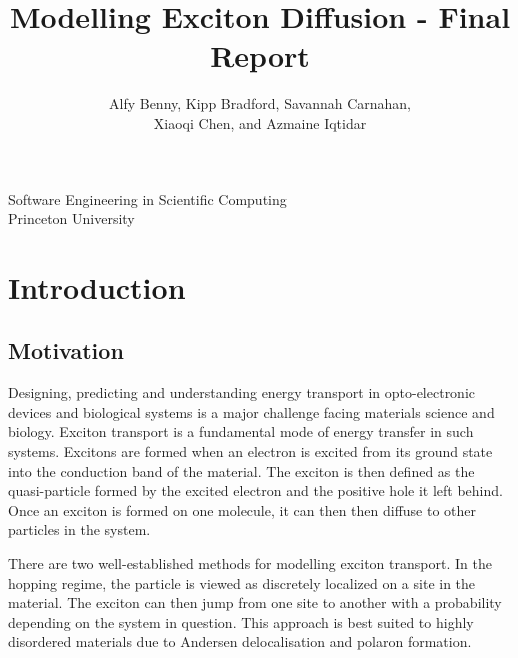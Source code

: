 \documentclass{article}
\title{Modelling Exciton Diffusion - Final Report}
\author{Alfy Benny, Kipp Bradford, Savannah Carnahan,\\ Xiaoqi Chen, and Azmaine Iqtidar}
\begin{document}
       \maketitle
      
       \vfill
            
       
            
      \vfill
     
       \begin{center}
            
       Software Engineering in Scientific Computing\\
       Princeton University\\
       
    \end{center}    
  
\newpage

\tableofcontents %


\section{Introduction}

\subsection{Motivation}

Designing, predicting and understanding energy transport in opto-electronic devices and biological systems is a major challenge facing materials science and biology. Exciton transport is a fundamental mode of energy transfer in such systems. Excitons are formed when an electron is excited from its ground state into the conduction band of the material. The exciton is then defined as the quasi-particle formed by the excited electron and the positive hole it left behind. Once an exciton is formed on one molecule, it can then then diffuse to other particles in the system. 

There are two well-established methods for modelling exciton transport.\cite{Oberhofer2017ChargeMethods} In the hopping regime, the particle is viewed as discretely localized on a site in the material. The exciton can then jump from one site to another with a probability depending on the system in question. This approach is best suited to highly disordered materials due to Andersen delocalisation and polaron formation.\cite{DanielBalzer2021DelocalisedMaterials}
\end{document}
